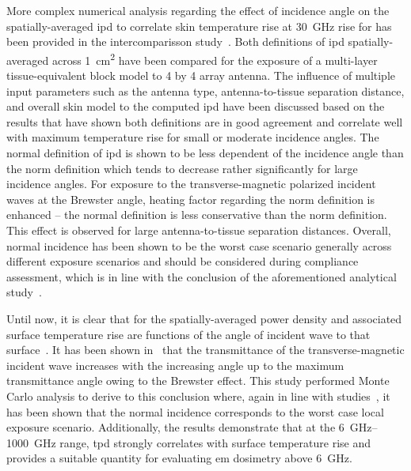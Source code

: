 More complex numerical analysis regarding the effect of incidence angle on the spatially-averaged \gls{ipd} to correlate skin temperature rise at \SI{30}{\GHz} rise for has been provided in the intercomparisson study~\cite{Diao2021Effect}.
Both definitions of \gls{ipd} spatially-averaged across \SI{1}{\cm\squared} have been compared for the exposure of a multi-layer tissue-equivalent block model to 4 by 4 array antenna.
The influence of multiple input parameters such as the antenna type, antenna-to-tissue separation distance, and overall skin model to the computed \gls{ipd} have been discussed based on the results that have shown both definitions are in good agreement and correlate well with maximum temperature rise for small or moderate incidence angles.
The normal definition of \gls{ipd} is shown to be less dependent of the incidence angle than the norm definition which tends to decrease rather significantly for large incidence angles.
For exposure to the transverse-magnetic polarized incident waves at the Brewster angle, heating factor regarding the norm definition is enhanced -- the normal definition is less conservative than the norm definition.
This effect is observed for large antenna-to-tissue separation distances.
Overall, normal incidence has been shown to be the worst case scenario generally across different exposure scenarios and should be considered during compliance assessment, which is in line with the conclusion of the aforementioned analytical study~\cite{Poljak2018On}.

Until now, it is clear that for the spatially-averaged power density and associated surface temperature rise are functions of the angle of incident wave to that surface~\cite{Hirata2021Assessment}.
It has been shown in~\cite{Li2019Relationship} that the transmittance of the transverse-magnetic incident wave increases with the increasing angle up to the maximum transmittance angle owing to the Brewster effect.
This study performed Monte Carlo analysis to derive to this conclusion where, again in line with studies~\cite{Poljak2018On,Diao2021Effect}, it has been shown that the normal incidence corresponds to the worst case local exposure scenario.
Additionally, the results demonstrate that at the \SIrange[range-units=single,range-phrase=--]{6}{1000}{\GHz} range, \gls{tpd} strongly correlates with surface temperature rise and provides a suitable quantity for evaluating \gls{em} dosimetry above \SI{6}{\GHz}.

